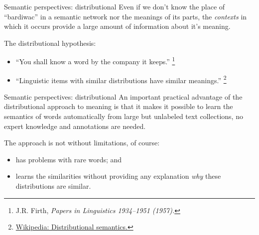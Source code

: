\documentclass[style=upen, size=14pt]{powerdot}
\begin{document}
\begin{slide}[toc=]{Semantic perspectives: distributional}
  Even if we don't know the place of ``bardiwac'' in a semantic network nor the
  meanings of its parts, the \emph{contexts} in which it occurs provide a large
  amount of information about it's meaning.\pause

  \bigskip

  The distributional hypothesis:\pause
  \begin{itemize}
  \item ``You shall know a word by the company it keeps.''
    \footnote{J.R. Firth, \emph{Papers in Linguistics 1934--1951 (1957).}}\pause
  \item ``Linguistic items with similar distributions have similar meanings.''
    \footnote{\href{https://en.wikipedia.org/wiki/Distributional_semantics}{Wikipedia:
        Distributional semantics.}}
  \end{itemize}
\end{slide}

\begin{slide}[toc=]{Semantic perspectives: distributional}
  An important practical advantage of the distributional approach to meaning is
  that it makes it possible to learn the semantics of words automatically from
  large but unlabeled text collections, no expert knowledge and annotations are
  needed.\pause
  
  \bigskip

  The approach is not without limitations, of course:\pause
  \begin{itemize}
  \item has problems with rare words; and\pause
  \item learns the similarities without providing any explanation \emph{why}
    these distributions are similar.
  \end{itemize}
\end{slide}
\end{document}
